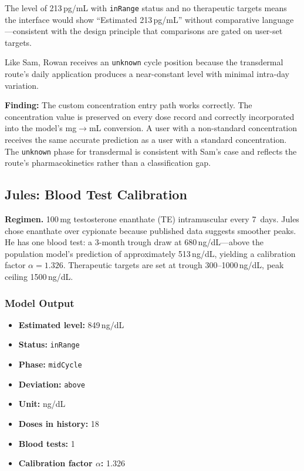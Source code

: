 \documentclass[11pt,a4paper]{article}
\newcommand{\code}[1]{\texttt{\small #1}}
\begin{document}
The level of 213\,pg/mL with \code{inRange} status and no therapeutic
targets means the interface would show ``Estimated 213\,pg/mL'' without
comparative language---consistent with the design principle that comparisons
are gated on user-set targets.

Like Sam, Rowan receives an \code{unknown} cycle position because the
transdermal route's daily application produces a near-constant level with
minimal intra-day variation.

\textbf{Finding:} The custom concentration entry path works correctly. The
concentration value is preserved on every dose record and correctly
incorporated into the model's mg$\rightarrow$mL conversion. A user with a
non-standard concentration receives the same accurate prediction as a user
with a standard concentration. The \code{unknown} phase for transdermal is
consistent with Sam's case and reflects the route's pharmacokinetics rather
than a classification gap.

\subsection{Jules: Blood Test Calibration}
\label{sec:jules}

\textbf{Regimen.} 100\,mg testosterone enanthate (TE) intramuscular every
7~days. Jules chose enanthate over cypionate because published data suggests
smoother peaks. He has one blood test: a 3-month trough draw at
680\,ng/dL---above the population model's prediction of approximately
513\,ng/dL, yielding a calibration factor $\alpha = 1.326$. Therapeutic
targets are set at trough 300--1000\,ng/dL, peak ceiling 1500\,ng/dL.

\subsubsection{Model Output}

\begin{itemize}[nosep,leftmargin=1.4em]
\item \textbf{Estimated level:} 849\,ng/dL
\item \textbf{Status:} \code{inRange}
\item \textbf{Phase:} \code{midCycle}
\item \textbf{Deviation:} \code{above}
\item \textbf{Unit:} ng/dL
\item \textbf{Doses in history:} 18
\item \textbf{Blood tests:} 1
\item \textbf{Calibration factor $\alpha$:} 1.326
\end{itemize}
\end{document}
